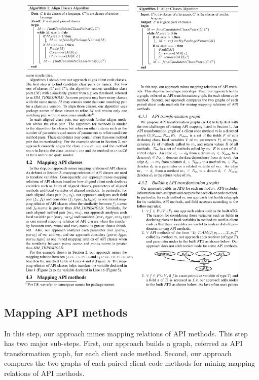 \begin{figure}[t]
\centering
\includegraphics[scale=1,clip]{figure/algorithm1.eps}
\vspace*{-6ex}
\end{figure}

\subsection{Mapping API methods}
\label{sec:approach:mappingtypes}

In this step, our approach mines mapping relations of API methods.
This step has two major sub-steps. First, our approach builds a graph, referred
as API transformation graph, for each client code
method. Second, our approach compares the two graphs of each paired
client code methods for mining mapping relations of API methods.


